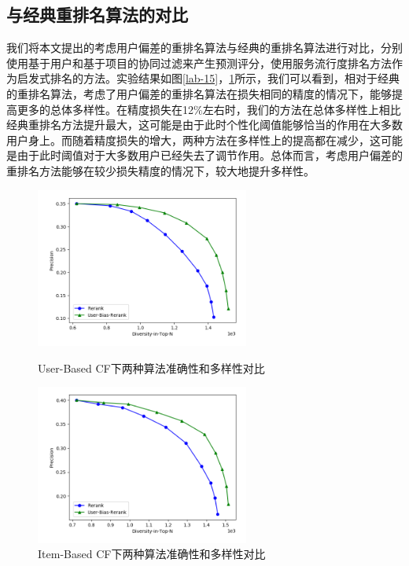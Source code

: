 \documentclass[master,winfonts]{njuthesis}
\begin{document}
\subsection{与经典重排名算法的对比}
我们将本文提出的考虑用户偏差的重排名算法与经典的重排名算法进行对比，分别使用基于用户和基于项目的协同过滤来产生预测评分，使用服务流行度排名方法作为启发式排名的方法。实验结果如图\ref{lab-15}，\ref{lab-16}所示，我们可以看到，相对于经典的重排名算法，考虑了用户偏差的重排名算法在损失相同的精度的情况下，能够提高更多的总体多样性。在精度损失在12$\%$左右时，我们的方法在总体多样性上相比经典重排名方法提升最大，这可能是由于此时个性化阈值能够恰当的作用在大多数用户身上。而随着精度损失的增大，两种方法在多样性上的提高都在减少，这可能是由于此时阈值对于大多数用户已经失去了调节作用。总体而言，考虑用户偏差的重排名方法能够在较少损失精度的情况下，较大地提升多样性。
\begin{figure}[htbp]
\centering
\begin{minipage}[t]{0.48\textwidth}
\centering
\includegraphics[width=7cm]{diversity_3.png}
\caption{User-Based CF下两种算法准确性和多样性对比}\label{lab-15}
\end{minipage}
\begin{minipage}[t]{0.48\textwidth}
\centering
\includegraphics[width=7cm]{diversity_4.png}
\caption{Item-Based CF下两种算法准确性和多样性对比}\label{lab-16}
\end{minipage}
\end{figure}
\end{document}
